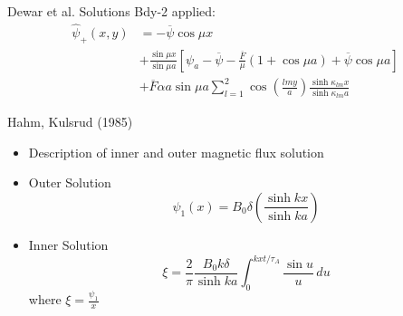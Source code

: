 \documentclass[compress]{beamer}
\newcounter{Segment}
\newcommand{\finishSegment}{\label{endSegment\theSegment}}
\begin{document}
\begin{frame}{Dewar et al. Solutions}
Bdy-2 applied:
\begin{equation}
    \begin{split}
        \hat{\psi}_+ (x,y) & = -\overline{\psi}\cos{\mu x} \\
                           & + \frac{\sin{\mu x}}{\sin{\mu a}} \left[\psi_a - \overline{\psi} - \frac{\overline{F}}{\mu}\left( 1+\cos{\mu a} \right) + \overline{\psi}\cos{\mu a} \right] \\
                           & + \overline{F}\alpha a \sin{\mu a} \sum_{l=1}^{2} \cos\left( \frac{lmy}{a} \right) \frac{\sinh{\kappa_{lm} x}}{\sinh{\kappa_{lm} a}}
    \end{split}
\end{equation} 
\end{frame}

\begin{frame}{Hahm, Kulsrud (1985) \cite{hahmkulsrud}}
    \begin{itemize}
        \item Description of inner and outer magnetic flux solution
        \item Outer Solution
        \begin{equation}
            \psi_1(x) = B_0\delta\left( \frac{\sinh{kx}}{\sinh{ka}} \right) 
        \end{equation} 
        \item Inner Solution
            \begin{equation}
                \xi=\frac{2}{\pi}\frac{B_0 k\delta}{\sinh{ka}}\int_{0}^{kxt / \tau_A}\frac{\sin{u}}{u}\, du  
            \end{equation} 
        where $\xi=\frac{\psi_1}{x}$
    \end{itemize}
    \finishSegment
\end{frame}
\end{document}

